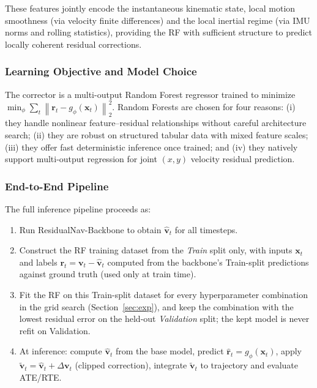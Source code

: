 \documentclass[10pt,conference,letterpaper]{IEEEtran}
\begin{document}
These features jointly encode the instantaneous kinematic state,
local motion smoothness (via velocity finite differences) and the
local inertial regime (via IMU norms and rolling statistics), providing
the RF with sufficient structure to predict locally coherent residual
corrections.

\subsubsection{Learning Objective and Model Choice}

The corrector is a multi-output Random Forest regressor trained to
minimize $\min_\phi \sum_t \left\| \mathbf{r}_t - g_\phi(\mathbf{x}_t) \right\|_2^2$.
Random Forests \cite{breiman2001} are chosen for four reasons: (i) they
handle nonlinear feature--residual relationships without careful
architecture search; (ii) they are robust on structured tabular data
with mixed feature scales; (iii) they offer fast deterministic
inference once trained; and (iv) they natively support multi-output
regression for joint $(x, y)$ velocity residual prediction.

\subsubsection{End-to-End Pipeline}

The full inference pipeline proceeds as:
\begin{enumerate}
  \item Run ResidualNav-Backbone to obtain $\hat{\mathbf{v}}_t$
        for all timesteps.
  \item Construct the RF training dataset from the \emph{Train} split
        only, with inputs $\mathbf{x}_t$ and labels
        $\mathbf{r}_t = \mathbf{v}_t - \hat{\mathbf{v}}_t$ computed from
        the backbone's Train-split predictions against ground truth
        (used only at train time).
  \item Fit the RF on this Train-split dataset for every
        hyperparameter combination in the grid search (Section~\ref{sec:exp}),
        and keep the combination with the lowest residual error on the
        held-out \emph{Validation} split; the kept model is never
        refit on Validation.
  \item At inference: compute $\hat{\mathbf{v}}_t$ from the base
        model, predict $\hat{\mathbf{r}}_t = g_\phi(\mathbf{x}_t)$,
        apply $\tilde{\mathbf{v}}_t = \hat{\mathbf{v}}_t + \Delta \mathbf{v}_t$
        (clipped correction), integrate $\tilde{\mathbf{v}}_t$ to
        trajectory and evaluate ATE/RTE.
\end{enumerate}
\end{document}
